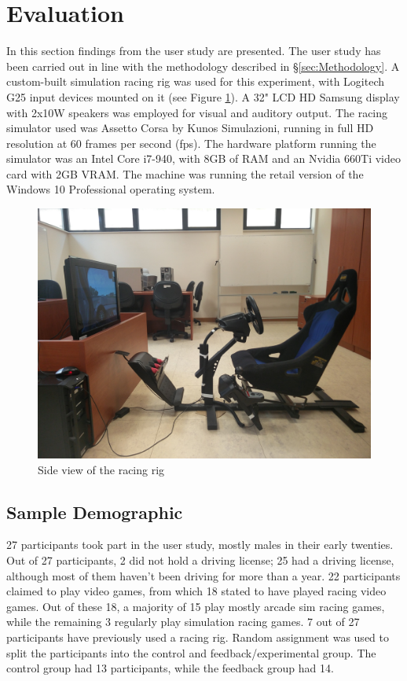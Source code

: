 \documentclass{sig-alternate}
\begin{document}
{\section{Evaluation} 
\label{sec:Evaluation}
In this section findings from the user study are presented. The user study has been carried out in line with the methodology described in \S\ref{sec:Methodology}. A custom-built simulation racing rig was used for this experiment, with Logitech G25 input devices mounted on it (see Figure \ref{fig:eval-simRacingRig}). A 32" LCD HD Samsung display with 2x10W speakers was employed for visual and auditory output. The racing simulator used was Assetto Corsa by Kunos Simulazioni, running in full HD resolution at 60 frames per second (fps). The hardware platform running the simulator was an Intel Core i7-940, with 8GB of RAM and an Nvidia 660Ti video card with 2GB VRAM. The machine was running the retail version of the Windows 10 Professional operating system.

\begin{figure}[!htb]
	\centering
	\begin{minipage}{0.45\textwidth}
		\centering
		\includegraphics[width=\textwidth]{images/RacingRig}
	\end{minipage}\hfill
	\caption[Side view of the racing rig]{Side view of the racing rig}
	\label{fig:eval-simRacingRig}
\end{figure}

\subsection{Sample Demographic}
27 participants took part in the user study, mostly males in their early twenties. Out of 27 participants, 2 did not hold a driving license; 25 had a driving license, although most of them haven't been driving for more than a year. 22 participants claimed to play video games, from which 18 stated to have played racing video games. Out of these 18, a majority of 15 play mostly arcade sim racing games, while the remaining 3 regularly play simulation racing games. 7 out of 27 participants have previously used a racing rig. Random assignment was used to split the participants into the control and feedback/experimental group. The control group had 13 participants, while the feedback group had 14.

}
\end{document}
